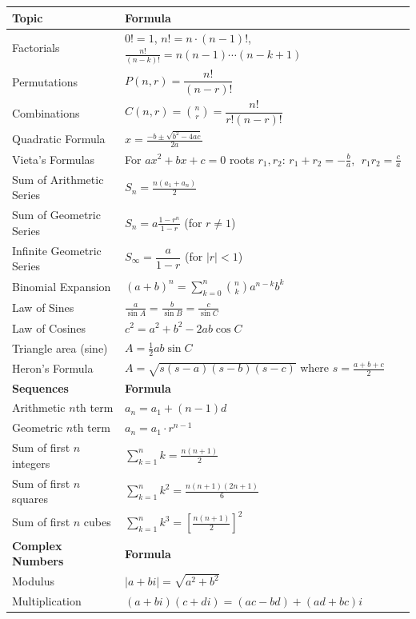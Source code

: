 \documentclass{article}
\begin{document}
\begin{center}
\begin{tabularx}{\textwidth}{|>{\raggedright\arraybackslash}X|>{\raggedright\arraybackslash}X|}
\hline
\textbf{Topic} & \textbf{Formula} \\
\hline
Factorials & $0! = 1$, $n! = n \cdot (n-1)!$, $\frac{n!}{(n-k)!} = n(n-1)\cdots(n-k+1)$ \\
Permutations & $P(n,r) = \dfrac{n!}{(n-r)!}$ \\
Combinations & $C(n,r) = \binom{n}{r} = \dfrac{n!}{r!(n-r)!}$ \\
Quadratic Formula & $x = \frac{-b \pm \sqrt{b^2-4ac}}{2a}$ \\
Vieta's Formulas & For $ax^2+bx+c=0$ roots $r_1,r_2$: $r_1+r_2=-\tfrac{b}{a}$, $\;r_1r_2=\tfrac{c}{a}$ \\
Sum of Arithmetic Series & $S_n = \frac{n(a_1 + a_n)}{2}$ \\
Sum of Geometric Series & $S_n = a\frac{1-r^n}{1-r}$ (for $r \neq 1$) \\
Infinite Geometric Series & $S_\infty = \dfrac{a}{1-r}$ (for $|r|<1$) \\
Binomial Expansion & $(a+b)^n = \sum_{k=0}^{n} \binom{n}{k}a^{n-k}b^k$ \\
Law of Sines & $\frac{a}{\sin A} = \frac{b}{\sin B} = \frac{c}{\sin C}$ \\
Law of Cosines & $c^2 = a^2 + b^2 - 2ab\cos C$ \\
Triangle area (sine) & $A = \tfrac{1}{2}ab\sin C$ \\
Heron's Formula & $A = \sqrt{s(s-a)(s-b)(s-c)}$ where $s = \frac{a+b+c}{2}$ \\
\hline
\textbf{Sequences} & \textbf{Formula} \\
\hline
Arithmetic $n$th term & $a_n = a_1 + (n-1)d$ \\
Geometric $n$th term & $a_n = a_1 \cdot r^{n-1}$ \\
Sum of first $n$ integers & $\sum_{k=1}^{n} k = \frac{n(n+1)}{2}$ \\
Sum of first $n$ squares & $\sum_{k=1}^{n} k^2 = \frac{n(n+1)(2n+1)}{6}$ \\
Sum of first $n$ cubes & $\sum_{k=1}^{n} k^3 = \left[\frac{n(n+1)}{2}\right]^2$ \\
\hline
\textbf{Complex Numbers} & \textbf{Formula} \\
\hline
Modulus & $|a+bi| = \sqrt{a^2+b^2}$ \\
Multiplication & $(a+bi)(c+di) = (ac-bd) + (ad+bc)i$ \\

\end{tabularx}
\end{center}
\end{document}
